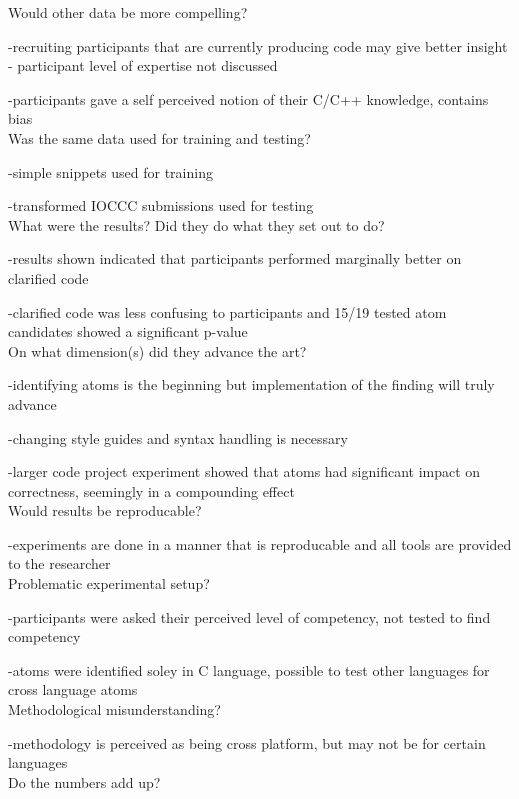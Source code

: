 \documentclass{IEEEtran}
\begin{document}
Would other data be more compelling? 

-recruiting participants that are currently producing code may give better insight - participant level of expertise 
not discussed

-participants gave a self perceived notion of their C/C++ knowledge, contains bias
\\

Was the same data used for training and testing?

-simple snippets used for training

-transformed IOCCC submissions used for testing
\\

What were the results? Did they do what they set out to do?

-results shown indicated that participants performed marginally better on clarified code

-clarified code was less confusing to participants and 15/19 tested atom candidates showed a significant p-value
\\

On what dimension(s) did they advance the art?

-identifying atoms is the beginning but implementation of the finding will truly advance

-changing style guides and syntax handling is necessary

-larger code project experiment showed that atoms had significant impact on correctness, seemingly in a compounding 
effect
\\

Would results be reproducable? 

-experiments are done in a manner that is reproducable and all tools are provided to the researcher
\\

Problematic experimental setup? 

-participants were asked their perceived level of competency, not tested to find competency

-atoms were identified soley in C language, possible to test other languages for cross language atoms
\\

Methodological misunderstanding? 

-methodology is perceived as being cross platform, but may not be for certain languages
\\

Do the numbers add up? 
\end{document}

